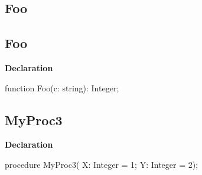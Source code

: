 \documentclass{report}
\newif\ifpdf
\begin{document}
\subsection*{\large{\textbf{Foo}}\normalsize\hspace{1ex}\hrulefill}
\else
\subsection*{Foo}
\fi
\label{ok_macros-Foo}
\begin{list}{}{
\setlength{\itemindent}{0cm}
\setlength{\listparindent}{0cm}
\setlength{\leftmargin}{\evensidemargin}
\addtolength{\leftmargin}{\tmplength}
\settowidth{\labelsep}{X}
\addtolength{\leftmargin}{\labelsep}
\setlength{\labelwidth}{\tmplength}
}
\item[\textbf{Declaration}\hfill]
\ifpdf
\begin{flushleft}
\fi
\begin{ttfamily}
function Foo(c: string): Integer;\end{ttfamily}

\ifpdf
\end{flushleft}
\fi

\end{list}
\ifpdf
\subsection*{\large{\textbf{MyProc3}}\normalsize\hspace{1ex}\hrulefill}
\else
\subsection*{MyProc3}
\fi
\label{ok_macros-MyProc3}
\begin{list}{}{
\setlength{\itemindent}{0cm}
\setlength{\listparindent}{0cm}
\setlength{\leftmargin}{\evensidemargin}
\addtolength{\leftmargin}{\tmplength}
\settowidth{\labelsep}{X}
\addtolength{\leftmargin}{\labelsep}
\setlength{\labelwidth}{\tmplength}
}
\item[\textbf{Declaration}\hfill]
\ifpdf
\begin{flushleft}
\fi
\begin{ttfamily}
procedure MyProc3( X: Integer = 1; Y: Integer = 2);\end{ttfamily}

\ifpdf
\end{flushleft}
\fi

\end{list}
\ifpdf
\end{document}
